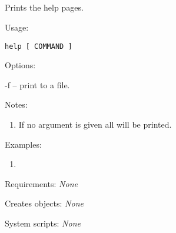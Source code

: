 

\subsection[help]{  }



Prints the help pages.


\begin{description}


\item{Usage:}

{\tt help [ COMMAND ]}


\item{Options:}
\begin{description}
\item -f -- print to a file.
\end{description}


\item{Notes:}
\begin{enumerate}
\item If no argument is given all will be printed.
\end{enumerate}


\item{Examples:}
\begin{enumerate}

\item
\begin{verbatim}
\end{verbatim}

\end{enumerate}


\item{Requirements:} {\em None}


\item{Creates objects:} {\em None}


\item{System scripts:} {\em None}

\end{description}


